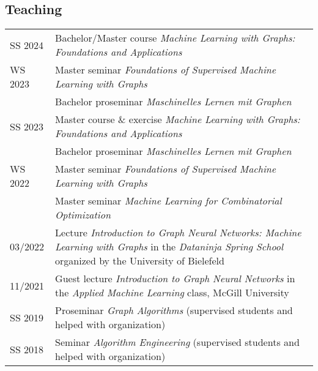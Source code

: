 \documentclass[11pt, a4paper, DIV=14, headings=small]{scrartcl}
\begin{document}
	\subsection*{Teaching}
	\begin{longtabu}{p{2.1cm}p{12.0cm}}
		SS 2024    & Bachelor/Master course \emph{Machine Learning with Graphs: Foundations and Applications}                                                                                   \\
		WS 2023    & Master seminar \emph{Foundations of Supervised Machine Learning with Graphs}          \\    
			       & Bachelor proseminar \emph{Maschinelles Lernen mit Graphen}                                                                                                               \\
		SS 2023    & Master course \& exercise \emph{Machine Learning with Graphs: Foundations and Applications}                                                                                   \\
		& Bachelor proseminar \emph{Maschinelles Lernen mit Graphen}                                                                                                                      \\
		WS 2022    & Master seminar \emph{Foundations of Supervised Machine Learning with Graphs}                                                                                                    \\
		& Master seminar \emph{Machine Learning for Combinatorial Optimization}                                                                                                           \\
		03/2022    & Lecture \emph{Introduction to Graph Neural Networks: Machine Learning with Graphs} in the \emph{Dataninja Spring School} organized by the University of Bielefeld               \\
		11/2021    & Guest lecture \emph{Introduction to Graph Neural Networks} in the \emph{Applied Machine Learning} class, McGill University                                                      \\
		SS 2019    & Proseminar \emph{Graph Algorithms} (supervised students and helped with organization)                                                                                           \\
		SS 2018    & Seminar \emph{Algorithm Engineering} (supervised students and helped with organization)                                                                                         \\

\end{longtabu}
\end{document}
